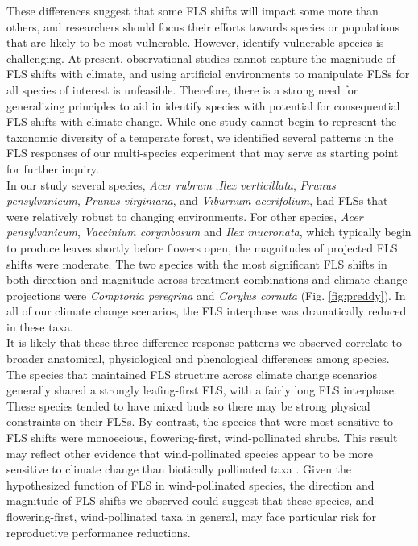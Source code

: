 \documentclass[11pt]{article}
\begin{document}
\noident These differences suggest that some FLS shifts will impact some more than others, and researchers should focus their efforts towards species or populations that are likely to be most vulnerable. However, identify vulnerable species is challenging. At present, observational studies cannot capture the magnitude of FLS shifts with climate, and using artificial environments to manipulate FLSs for all species of interest is unfeasible. Therefore, there is a strong need for generalizing principles to aid in identify species with potential for consequential FLS shifts with climate change. While one study cannot begin to represent the taxonomic diversity of a temperate forest, we identified several patterns in the FLS responses of our multi-species experiment that may serve as starting point for further inquiry.\\

\noindent In our study several species, \textit{Acer rubrum} ,\textit{Ilex verticillata}, \textit{Prunus pensylvanicum}, \textit{Prunus virginiana}, and \textit{Viburnum acerifolium}, had FLSs that were relatively robust to changing environments. For other species, \textit{Acer pensylvanicum}, \textit{Vaccinium corymbosum} and \textit{Ilex mucronata}, which typically begin to produce leaves shortly before flowers open, the magnitudes of projected FLS shifts were moderate. The two species with the most significant FLS shifts in both direction and magnitude across treatment combinations and climate change projections were \textit{Comptonia peregrina} and \textit{Corylus cornuta} (Fig. \ref{fig:preddy}). In all of our climate change scenarios, the FLS interphase was dramatically reduced in these taxa.\\
 
\noindent It is likely that these three difference response patterns we observed correlate to broader anatomical, physiological and phenological differences among species. The species that maintained FLS structure across climate change scenarios generally shared a strongly leafing-first FLS, with a fairly long FLS interphase. These species tended to have mixed buds so there may be strong physical constraints on their FLSs. By contrast, the species that were most sensitive to FLS shifts were monoecious, flowering-first, wind-pollinated shrubs. This result may reflect other evidence that wind-pollinated species appear to be more sensitive to climate change than biotically pollinated taxa \citep{Ziello:2012aa}. Given the hypothesized function of FLS in wind-pollinated species, the direction and magnitude of FLS shifts we observed could suggest that these species, and flowering-first, wind-pollinated taxa in general, may face particular risk for reproductive performance reductions.\\
\end{document}
